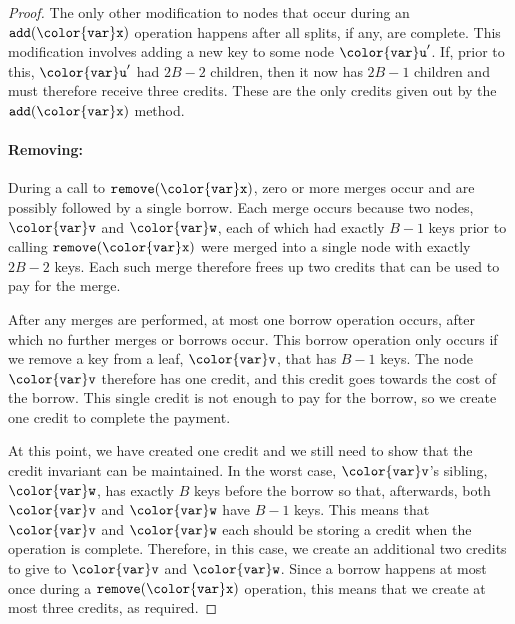 \documentclass[10pt]{book}
\theoremstyle{plain}
\theoremstyle{definition}
\begin{document}
\begin{proof}
  The only other modification to nodes that occur during an \ensuremath{\mathtt{add({\color{var}x})}}
  operation happens after all splits, if any, are complete.  This
  modification involves adding a new key to some node \ensuremath{\mathtt{{\color{var}u}'}}.  If, prior
  to this, \ensuremath{\mathtt{{\color{var}u}'}} had $2B-2$ children, then it now has $2B-1$ children and
  must therefore receive three credits.  These are the only credits given
  out by the \ensuremath{\mathtt{add({\color{var}x})}} method.

  \paragraph{Removing:}
  During a call to \ensuremath{\mathtt{remove({\color{var}x})}}, zero or more merges occur and are possibly
  followed by a single borrow.  Each merge occurs because two nodes,
  \ensuremath{\mathtt{{\color{var}v}}} and \ensuremath{\mathtt{{\color{var}w}}}, each of which had exactly $B-1$ keys prior to calling
  \ensuremath{\mathtt{remove({\color{var}x})}} were merged into a single node with exactly $2B-2$ keys.
  Each such merge therefore frees up two credits that can be used to
  pay for the merge.

  After any merges are performed, at most one borrow operation occurs,
  after which no further merges or borrows occur.  This borrow operation
  only occurs if we remove a key from a leaf, \ensuremath{\mathtt{{\color{var}v}}}, that has $B-1$ keys.
  The node \ensuremath{\mathtt{{\color{var}v}}} therefore has one credit, and this credit goes towards
  the cost of the borrow.  This single credit is not enough to pay for
  the borrow, so we create one credit to complete the payment.

  At this point, we have created one credit and we still need to show
  that the credit invariant can be maintained.  In the worst case,
  \ensuremath{\mathtt{{\color{var}v}}}'s sibling, \ensuremath{\mathtt{{\color{var}w}}}, has exactly $B$ keys before the borrow so that,
  afterwards, both \ensuremath{\mathtt{{\color{var}v}}} and \ensuremath{\mathtt{{\color{var}w}}} have $B-1$ keys.  This means that \ensuremath{\mathtt{{\color{var}v}}} and
  \ensuremath{\mathtt{{\color{var}w}}} each should be storing a credit when the operation is complete.
  Therefore, in this case, we create an additional two credits to give to
  \ensuremath{\mathtt{{\color{var}v}}} and \ensuremath{\mathtt{{\color{var}w}}}.  Since a borrow happens at most once during a \ensuremath{\mathtt{remove({\color{var}x})}}
  operation, this means that we create at most three credits, as required.


\end{proof}
\end{document}
